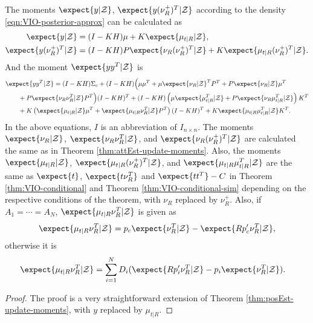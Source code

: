 \begin{theorem} \label{thm:VIO-posterior-conditional-moments}
	The moments $\expect{y|\mathcal{Z}}$, $\expect{y(\nu_R^+)^T|\mathcal{Z}}$ according to the density \eqref{eqn:VIO-posterior-approx} can be calculated as
	\begin{align}
		\expect{y|\mathcal{Z}} &= (I-KH)\mu + K\expect{\mu_{t|R}|\mathcal{Z}}, \\
		\expect{y(\nu_R^+)^T|\mathcal{Z}} &= (I-KH)P\expect{\nu_R(\nu_R^+)^T|\mathcal{Z}} + K\expect{\mu_{t|R}(\nu_R^+)^T|\mathcal{Z}}.
	\end{align}
	And the moment $\expect{yy^T|\mathcal{Z}}$ is
	\begin{align}
		&\expect{yy^T|\mathcal{Z}} = (I-KH)\Sigma_c + (I-KH) \Big( \mu\mu^T + \mu\expect{\nu_R|\mathcal{Z}}^TP^T + P\expect{\nu_R|\mathcal{Z}}\mu^T \nonumber \\
		&\qquad + P\expect{\nu_R\nu_R^T|\mathcal{Z}}P^T \Big) (I-KH)^T + (I-KH)\left( \mu\expect{\mu_{t|R}^T|\mathcal{Z}} + P\expect{\nu_R\mu_{t|R}^T|\mathcal{Z}} \right)K^T \nonumber \\
		&\qquad + K\left(\expect{\mu_{t|R}|\mathcal{Z}}\mu^T + \expect{\mu_{t|R}\nu_R^T|\mathcal{Z}}P^T\right)(I-KH)^T + K\expect{\mu_{t|R}\mu_{t|R}^T|\mathcal{Z}}K^T.
	\end{align}
	In the above equations, $I$ is an abbreviation of $I_{n\times n}$.
	The moments $\expect{\nu_R|\mathcal{Z}}$, $\expect{\nu_R\nu_R^T|\mathcal{Z}}$, and $\expect{\nu_R(\nu_R^+)^T|\mathcal{Z}}$ are calculated the same as in Theorem \ref{thm:attEst-update-moments}.
	Also, the moments $\expect{\mu_{t|R}|\mathcal{Z}}$, $\expect{\mu_{t|R}(\nu_R^+)^T|\mathcal{Z}}$, and $\expect{\mu_{t|R}\mu_{t|R}^T|\mathcal{Z}}$ are the same as $\expect{t}$, $\expect{t\nu_R^T}$ and $\expect{tt^T}-C$ in Theorem \ref{thm:VIO-conditional} and Theorem \ref{thm:VIO-conditional-sim} depending on the respective conditions of the theorem, with $\nu_R$ replaced by $\nu_R^+$.
	Also, if $A_1 = \cdots = A_N$, $\expect{\mu_{t|R}\nu_R^T|\mathcal{Z}}$ is given as
	\begin{align}
		\expect{\mu_{t|R}\nu_R^T|\mathcal{Z}} = p_c\expect{\nu_R^T|\mathcal{Z}} - \expect{Rp'_c\nu_R^T|\mathcal{Z}},
	\end{align}
	otherwise it is
	\begin{align}
		\expect{\mu_{t|R}\nu_R^T|\mathcal{Z}} &= \sum_{i=1}^N D_i(\expect{Rp'_i\nu_R^T|\mathcal{Z}} - p_i\expect{\nu_R^T|\mathcal{Z}}).
	\end{align}
\end{theorem}
\begin{proof}
	The proof is a very straightforward extension of Theorem \ref{thm:posEst-update-moments}, with $y$ replaced by $\mu_{t|R}$.
\end{proof}

